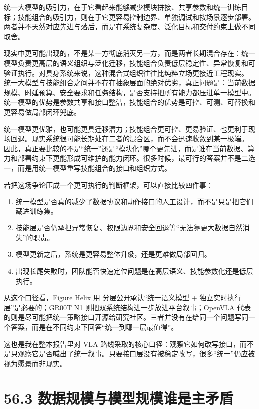 统一大模型的吸引力，在于它看起来能够减少模块拼接、共享参数和统一训练目标；技能组合的吸引力，则在于它更容易控制边界、单独调试和按场景逐步部署。两者并不天然对应先进与落后，而是在系统复杂度、泛化目标和交付约束上做不同取舍。

现实中更可能出现的，不是某一方彻底消灭另一方，而是两者长期混合存在：统一模型负责更高层的语义组织与泛化迁移，技能组合负责低层稳定性、异常恢复和可验证执行。对具身系统来说，这种混合式组织往往比纯粹立场更接近工程现实。 统一大模型与技能组合之间并不存在抽象层面的绝对优劣，真正问题是：当前数据规模、时延预算、安全要求和任务结构，是否支持把所有能力都压进单一模型中。统一模型的优势是参数共享和接口整洁，技能组合的优势是可控、可测、可替换和更容易做局部闭环兜底。

统一模型更优雅，也可能更具迁移潜力；技能组合更可控、更易验证、也更利于现场回退。现实系统很可能长期处在二者的混合区，而不会迅速收敛到某一极端。 因此，真正要比较的不是“统一”还是“模块化”哪个更先进，而是谁在当前数据、算力和部署约束下更能形成可维护的能力闭环。很多时候，最可行的答案并不是二选一，而是用统一模型重写技能组合的接口和组织方式。

若把这场争论压成一个更可执行的判断框架，可以直接比较四件事：

\begin{enumerate}
\item 统一模型是否真的减少了数据协议和动作接口的人工设计，而不是只是把它们藏进训练集。
\item 技能层是否仍承担异常恢复、权限边界和安全回退等“无法靠更大数据自然消失”的职责。
\item 模型更新之后，系统是更容易整体升级，还是更难做局部回归。
\item 出现长尾失败时，团队能否快速定位问题是在高层语义、技能参数化还是低层执行。
\end{enumerate}

从这个口径看，\href{https://www.figure.ai/news/helix}{Figure Helix} 用  分层公开承认“统一语义模型 + 独立实时执行层”是必要的；\href{https://arxiv.org/abs/2503.14734}{GR00T N1} 则把双系统结构进一步放进平台叙事；\href{https://arxiv.org/abs/2406.09246}{OpenVLA} 代表的则是尽可能把统一策略接口开源给研究社区。三者并没有在给同一个问题写同一个答案，而是在不同约束下回答“统一到哪一层最值得”。

这也是我在整本报告里对 VLA 路线采取的核心口径：观察它如何改写接口，而不是只观察它是否喊出了统一叙事。只要接口层没有被稳定改写，很多“统一”仍应被视为愿景而非现实。

\section*{56.3 数据规模与模型规模谁是主矛盾}


